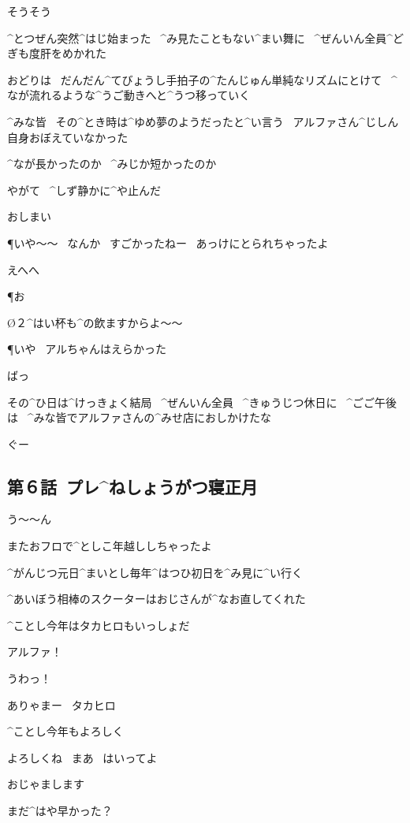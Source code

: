 \A そうそう

\page[109]
\N ^{とつぜん}{突然}^{はじ}{始}まった
\ ^{み}{見}たこともない^{まい}{舞}に
\ ^{ぜんいん}{全員}^{どぎも}{度肝}をめかれた

\page
\N おどりは
\ だんだん^{てびょうし}{手拍子}の^{たんじゅん}{単純}なリズムにとけて
\ ^{なが}{流}れるような^{うご}{動}きへと^{うつ}{移}っていく

\page
\N ^{みな}{皆}
\ その^{とき}{時}は^{ゆめ}{夢}のようだったと^{い}{言}う
\ アルファさん^{じしん}{自身}おぼえていなかった

\N ^{なが}{長}かったのか
\ ^{みじか}{短}かったのか

\page
\N やがて
\ ^{しず}{静}かに^{や}{止}んだ

\A おしまい

\P いや〜〜
\ なんか
\ すごかったねー
\ あっけにとられちゃったよ

\A えへへ

\page
\P お

\O ２^{はい}{杯}も^{の}{飲}ますからよ〜〜

\P いや
\ アルちゃんはえらかった

\page
\A ばっ

\N その^{ひ}{日}は^{けっきょく}{結局}
\ ^{ぜんいん}{全員}
\ ^{きゅうじつ}{休日}に
\ ^{ごご}{午後}は
\ ^{みな}{皆}でアルファさんの^{みせ}{店}におしかけたな

\A ぐー


\subsection{第６話\ プレ^{ねしょうがつ}{寝正月}}

\page[116]
\A う〜〜ん

\A またおフロで^{としこ}{年越}ししちゃったよ

\A ^{がんじつ}{元日}^{まいとし}{毎年}^{はつひ}{初日}を^{み}{見}に^{い}{行}く

\A ^{あいぼう}{相棒}のスクーターはおじさんが^{なお}{直}してくれた

\page
\A ^{ことし}{今年}はタカヒロもいっしょだ

\T アルファ！

\A うわっ！

\page
\A ありゃまー
\ タカヒロ

\T ^{ことし}{今年}もよろしく

\A よろしくね
\ まあ
\ はいってよ

\T おじゃまします

\T まだ^{はや}{早}かった？

